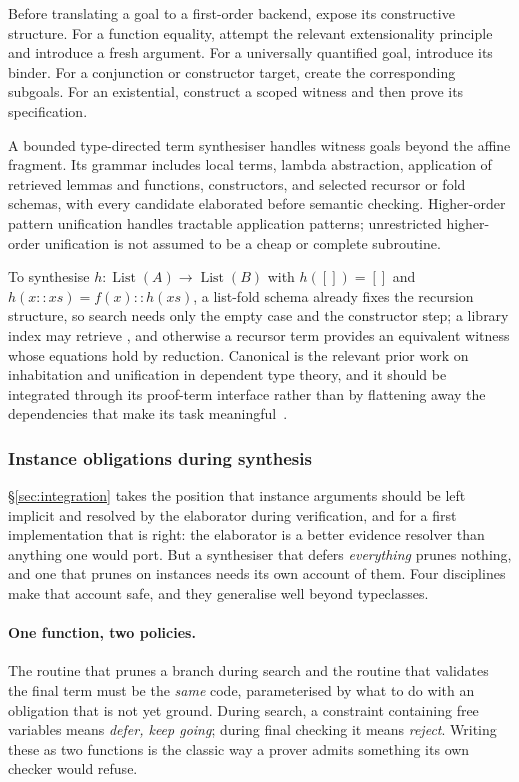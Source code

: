Before translating a goal to a first-order backend, expose its constructive
structure. For a function equality, attempt the relevant extensionality
principle and introduce a fresh argument. For a universally quantified goal,
introduce its binder. For a conjunction or constructor target, create the
corresponding subgoals. For an existential, construct a scoped witness and then
prove its specification.

A bounded type-directed term synthesiser handles witness goals beyond the affine
fragment. Its grammar includes local terms, lambda abstraction, application of
retrieved lemmas and functions, constructors, and selected recursor or fold
schemas, with every candidate elaborated before semantic checking. Higher-order
pattern unification handles tractable application patterns; unrestricted
higher-order unification is not assumed to be a cheap or complete subroutine.

To synthesise $h:\operatorname{List}(A)\to\operatorname{List}(B)$ with
$h([])=[]$ and $h(x::xs)=f(x)::h(xs)$, a list-fold schema already fixes the
recursion structure, so search needs only the empty case and the constructor
step; a library index may retrieve , and otherwise a recursor term
provides an equivalent witness whose equations hold by reduction. Canonical is
the relevant prior work on inhabitation and unification in dependent type
theory, and it should be integrated through its proof-term interface rather than
by flattening away the dependencies that make its task
meaningful~\cite{canonical,canonical-min}.

\subsubsection*{Instance obligations during synthesis}

\S\ref{sec:integration} takes the position that instance arguments should be
left implicit and resolved by the elaborator during verification, and for a
first implementation that is right: the elaborator is a better evidence
resolver than anything one would port. But a synthesiser that defers
\emph{everything} prunes nothing, and one that prunes on instances needs its
own account of them. Four disciplines make that account safe, and they
generalise well beyond typeclasses.

\paragraph{One function, two policies.} The routine that prunes a branch during
search and the routine that validates the final term must be the \emph{same}
code, parameterised by what to do with an obligation that is not yet ground.
During search, a constraint containing free variables means \emph{defer, keep
going}; during final checking it means \emph{reject}. Writing these as two
functions is the classic way a prover admits something its own checker would
refuse.


